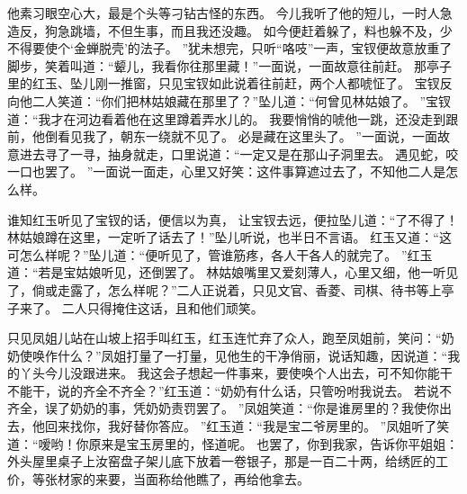 他素习眼空心大，最是个头等刁钻古怪的东西。
今儿我听了他的短儿，一时人急造反，狗急跳墙，不但生事，而且我还没趣。
如今便赶着躲了，料也躲不及，少不得要使个‘金蝉脱壳’的法子。
”犹未想完，只听“咯吱”一声，宝钗便故意放重了脚步，笑着叫道：“颦儿，我看你往那里藏！”一面说，一面故意往前赶。
那亭子里的红玉、坠儿刚一推窗，只见宝钗如此说着往前赶，两个人都唬怔了。
宝钗反向他二人笑道：“你们把林姑娘藏在那里了？”坠儿道：“何曾见林姑娘了。
”宝钗道：“我才在河边看着他在这里蹲着弄水儿的。
我要悄悄的唬他一跳，还没走到跟前，他倒看见我了，朝东一绕就不见了。
必是藏在这里头了。
”一面说，一面故意进去寻了一寻，抽身就走，口里说道：“一定又是在那山子洞里去。
遇见蛇，咬一口也罢了。
”一面说一面走，心里又好笑：这件事算遮过去了，不知他二人是怎么样。
\par
谁知红玉听见了宝钗的话，便信以为真， 让宝钗去远，便拉坠儿道：“了不得了！林姑娘蹲在这里，一定听了话去了！”坠儿听说，也半日不言语。
红玉又道：“这可怎么样呢？”坠儿道：“便听见了，管谁筋疼，各人干各人的就完了。
”红玉道：“若是宝姑娘听见，还倒罢了。
林姑娘嘴里又爱刻薄人，心里又细，他一听见了，倘或走露了，怎么样呢？”二人正说着，只见文官、香菱、司棋、待书等上亭子来了。
二人只得掩住这话，且和他们顽笑。
\par
只见凤姐儿站在山坡上招手叫红玉，红玉连忙弃了众人，跑至凤姐前，笑问：“奶奶使唤作什么？”凤姐打量了一打量，见他生的干净俏丽，说话知趣，因说道：“我的丫头今儿没跟进来。
我这会子想起一件事来，要使唤个人出去，可不知你能干不能干，说的齐全不齐全？”红玉道：“奶奶有什么话，只管吩咐我说去。
若说不齐全，误了奶奶的事，凭奶奶责罚罢了。
”凤姐笑道：“你是谁房里的？我使你出去，他回来找你，我好替你答应。
”红玉道：“我是宝二爷房里的。
”凤姐听了笑道：“嗳哟！你原来是宝玉房里的，怪道呢。
也罢了，你到我家，告诉你平姐姐：外头屋里桌子上汝窑盘子架儿底下放着一卷银子，那是一百二十两，给绣匠的工价，等张材家的来要，当面称给他瞧了，再给他拿去。
